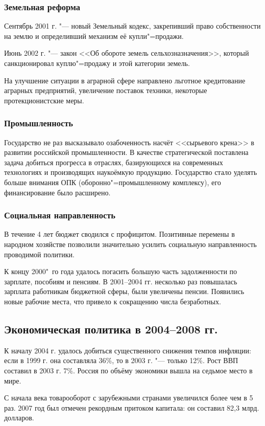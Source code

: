 \subsubsection{Земельная реформа}
Сентябрь 2001 г. "--- новый Земельный кодекс, закрепивший право собственности на землю и определивший механизм её купли"=продажи.

Июнь 2002 г. "--- закон <<Об обороте земель сельхозназначения>>, который санкционировал куплю"=продажу и этой категории земель.

На улучшение ситуации в аграрной сфере направлено льготное кредитование аграрных предприятий, увеличение поставок техники, некоторые протекционистские меры.

\subsubsection{Промышленность}
Государство не раз высказывало озабоченность насчёт <<сырьевого крена>> в развитии российской промышленности. В качестве стратегической поставлена задача добиться прогресса в отраслях, базирующихся на современных технологиях и производящих наукоёмкую продукцию. Государство стало уделять больше внимания ОПК (оборонно"=промышленному комплексу), его финансирование было расширено.

\subsubsection{Социальная направленность}
В течение 4 лет бюджет сводился с профицитом. Позитивные перемены в народном хозяйстве позволили значительно усилить социальную направленность проводимой политики.

К концу 2000"~го года удалось погасить большую часть задолженности по зарплате, пособиям и пенсиям. В 2001--2004 гг. несколько раз повышалась зарплата работникам бюджетной сферы, были увеличены пенсии. Появились новые рабочие места, что привело к сокращению числа безработных.

\subsection{Экономическая политика в 2004--2008 гг.}
К началу 2004 г. удалось добиться существенного снижения темпов инфляции: если в 1999 г. она составляла 36\%, то в 2003 г. "--- только 12\%. Рост ВВП составил в 2003 г. 7\%. Россия по объёму экономики вышла на седьмое место в мире.

С начала века товарооборот с зарубежными странами увеличился более чем в 5 раз. 2007 год был отмечен рекордным притоком капитала: он составил 82,3 млрд. долларов.

